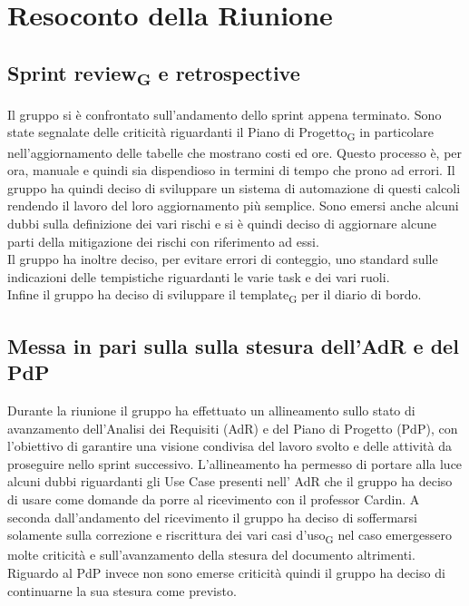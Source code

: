 \section{Resoconto della Riunione}

\subsection{Sprint review\textsubscript{G} e retrospective}
Il gruppo si è confrontato sull'andamento dello sprint appena terminato. Sono state segnalate
delle criticità riguardanti il Piano di Progetto\textsubscript{G} in particolare nell'aggiornamento delle tabelle 
che mostrano costi ed ore. Questo processo è, per ora, manuale e quindi sia dispendioso in termini di tempo 
che prono ad errori. Il gruppo ha quindi deciso di sviluppare un sistema di automazione di questi calcoli 
rendendo il lavoro del loro aggiornamento più semplice.
Sono emersi anche alcuni dubbi sulla definizione dei vari rischi e si è quindi deciso di aggiornare 
alcune parti della mitigazione dei rischi con riferimento ad essi.\\
Il gruppo ha inoltre deciso, per evitare errori di conteggio, uno standard sulle indicazioni delle tempistiche 
riguardanti le varie task e dei vari ruoli.\\
Infine il gruppo ha deciso di sviluppare il template\textsubscript{G} per il diario di bordo.

\subsection{Messa in pari sulla sulla stesura dell'AdR e del PdP}
Durante la riunione il gruppo ha effettuato un allineamento sullo stato di avanzamento dell'Analisi 
dei Requisiti (AdR) e del Piano di Progetto (PdP), con l'obiettivo di garantire una visione
condivisa del lavoro svolto e delle attività da proseguire nello sprint successivo.
L'allineamento ha permesso di portare alla luce alcuni dubbi riguardanti gli Use Case presenti nell' AdR 
che il gruppo ha deciso di usare come domande da porre al ricevimento con il professor Cardin.
A seconda dall'andamento del ricevimento il gruppo ha deciso di soffermarsi solamente sulla correzione e 
riscrittura dei vari casi d'uso\textsubscript{G} nel caso emergessero molte criticità e sull'avanzamento della stesura del 
documento altrimenti.\\
Riguardo al PdP invece non sono emerse criticità quindi il gruppo ha deciso di continuarne la sua stesura 
come previsto.

